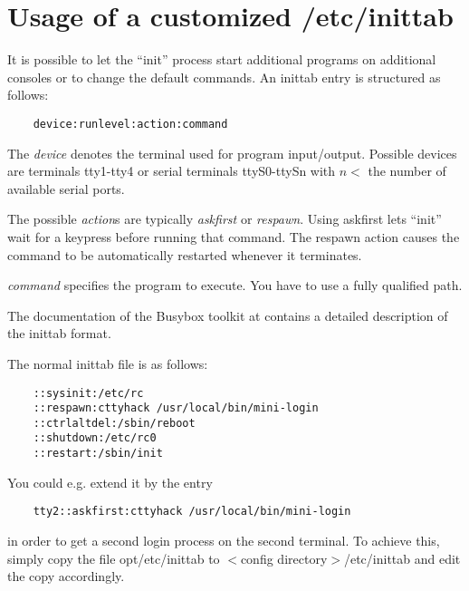 
\section{Usage of a customized /etc/inittab}
  It is possible to let the ``init'' process start additional programs
  on additional consoles or to change the default commands. An inittab entry
  is structured as follows:

  \begin{example}
  \begin{verbatim}
    device:runlevel:action:command
  \end{verbatim}
  \end{example}

  The \emph{device} denotes the terminal used for program input/output.
  Possible devices are terminals tty1-tty4 or serial terminals
  ttyS0-ttySn with $n <$ the number of available serial ports.

  The possible \emph{action}s are typically \emph{askfirst} or \emph{respawn}.
  Using askfirst lets ``init'' wait for a keypress before running that
  command. The respawn action causes the command to be automatically restarted
  whenever it terminates.

  \emph{command} specifies the program to execute. You have to use a fully
  qualified path.

  The documentation of the Busybox toolkit at 
  contains a detailed description of the inittab format.

  The normal inittab file is as follows:

  \begin{example}
  \begin{verbatim}
    ::sysinit:/etc/rc
    ::respawn:cttyhack /usr/local/bin/mini-login
    ::ctrlaltdel:/sbin/reboot
    ::shutdown:/etc/rc0
    ::restart:/sbin/init
  \end{verbatim}
  \end{example}

  You could e.g. extend it by the entry

  \begin{example}
  \begin{verbatim}
    tty2::askfirst:cttyhack /usr/local/bin/mini-login
  \end{verbatim}
  \end{example}

  in order to get a second login process on the second terminal. To achieve
  this, simply copy the file opt/etc/inittab to $<$config directory$>$/etc/inittab
  and edit the copy accordingly.

